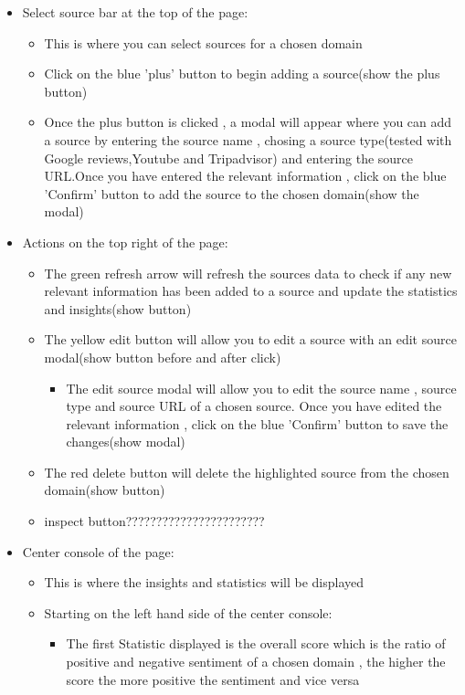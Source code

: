 \documentclass[12pt]{article}
\begin{document}
\begin{itemize}
\begin{itemize}
    \end{itemize}
    \item Select source bar at the top of the page:
    \begin{itemize}
        \item This is where you can select sources for a chosen domain 
        \item Click on the blue 'plus' button to begin adding a source(show the plus button)
        \item Once the plus button is clicked , a modal will appear where you can add a source by entering the source name , chosing a source type(tested with Google reviews,Youtube and Tripadvisor) and entering the source URL.Once you have entered the relevant information , click on the blue 'Confirm' button to add the source to the chosen domain(show the modal)
    \end{itemize}
    \item Actions on the top right of the page:
    \begin{itemize}
        \item The green refresh arrow will refresh the sources data to check if any new relevant information has been added to a source and update the statistics and insights(show button)
        \item The yellow edit button will allow you to edit a source with an edit source modal(show button before and after click)
        \begin{itemize}
            \item The edit source modal will allow you to edit the source name , source type and source URL of a chosen source. Once you have edited the relevant information , click on the blue 'Confirm' button to save the changes(show modal)
        \end{itemize}
        \item The red delete button will delete the highlighted source from the chosen domain(show button)
        \item inspect button???????????????????????
    \end{itemize}
    \item Center console of the page:
    \begin{itemize}
        \item This is where the insights and statistics will be displayed
        \item Starting on the left hand side of the center console:
        \begin{itemize}
            \item The first Statistic displayed is the overall score which is the ratio of positive and negative sentiment of a chosen domain , the higher the score the more positive the sentiment and vice versa

\end{itemize}
\end{itemize}
\end{itemize}
\end{document}
